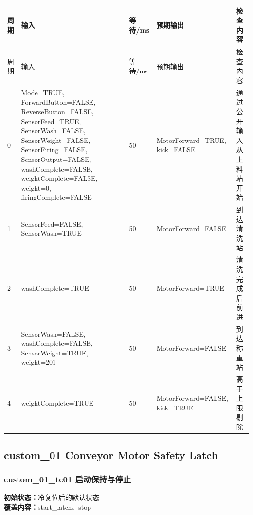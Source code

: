 \begin{longtable}{L{1.0cm}L{4.7cm}L{1.4cm}L{4.0cm}L{2.1cm}}

\toprule

周期 & 输入 & 等待/ms & 预期输出 & 检查内容\\

\midrule

\endfirsthead

\toprule

周期 & 输入 & 等待/ms & 预期输出 & 检查内容\\

\midrule

\endhead

0 & Mode=TRUE, ForwardButton=FALSE, ReverseButton=FALSE, SensorFeed=TRUE, SensorWash=FALSE, SensorWeight=FALSE, SensorFiring=FALSE, SensorOutput=FALSE, washComplete=FALSE, weightComplete=FALSE, weight=0, firingComplete=FALSE & 50 & MotorForward=TRUE, kick=FALSE & 通过公开输入从上料站开始\\

1 & SensorFeed=FALSE, SensorWash=TRUE & 50 & MotorForward=FALSE & 到达清洗站\\

2 & washComplete=TRUE & 50 & MotorForward=TRUE & 清洗完成后前进\\

3 & SensorWash=FALSE, washComplete=FALSE, SensorWeight=TRUE, weight=201 & 50 & MotorForward=FALSE & 到达称重站\\

4 & weightComplete=TRUE & 50 & MotorForward=FALSE, kick=TRUE & 高于上限剔除\\

\bottomrule

\end{longtable}

\subsection{{\ttfamily custom\_01} Conveyor Motor Safety Latch}

\subsubsection{{\ttfamily custom\_01\_tc01} 启动保持与停止}

\noindent\textbf{初始状态：}冷复位后的默认状态\\

\textbf{覆盖内容：}start\_latch、stop

